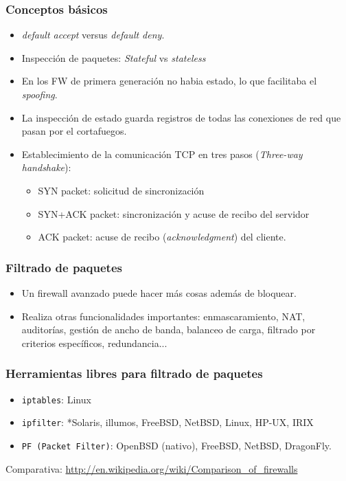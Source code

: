 \documentclass{beamer}
\begin{document}
\begin{frame}
\frametitle{Conceptos básicos}

\begin{itemize}
\item \textit{default accept} versus \textit{default deny}.
\item Inspección de paquetes: \textit{Stateful} vs \textit{stateless}  
\item En los FW de primera generación no habia estado, lo que facilitaba el \textit{spoofing}.
\item La inspección de estado guarda registros de todas las conexiones de red que pasan por el cortafuegos.
\item Establecimiento de la comunicación TCP en tres pasos (\textit{Three-way handshake}):

\begin{itemize}
	\item \alert{SYN packet}: solicitud de sincronización
	\item \alert{SYN+ACK packet}: sincronización y acuse de recibo del servidor
	\item \alert{ACK packet}: acuse de recibo (\textit{acknowledgment}) del cliente.
\end{itemize}

\end{itemize}

\end{frame}



\begin{frame}
\frametitle{Filtrado de paquetes}

\begin{itemize}
\item Un firewall avanzado puede hacer más cosas además de bloquear. 
\item Realiza otras funcionalidades importantes: enmascaramiento, NAT, auditorías, gestión de ancho de banda, balanceo de carga, filtrado por criterios específicos, redundancia...
\end{itemize}

\end{frame}


\begin{frame}
\frametitle{Herramientas libres para filtrado de paquetes}

\begin{itemize}
\item \alert{\texttt{iptables}}: Linux
\item \alert{\texttt{ipfilter}}: *Solaris, illumos, FreeBSD, NetBSD, Linux, HP-UX, IRIX
\item \alert{\texttt{PF (Packet Filter)}}: OpenBSD (nativo), FreeBSD, NetBSD, DragonFly.
\end{itemize}

Comparativa: \url{http://en.wikipedia.org/wiki/Comparison_of_firewalls}

\end{frame}
\end{document}
